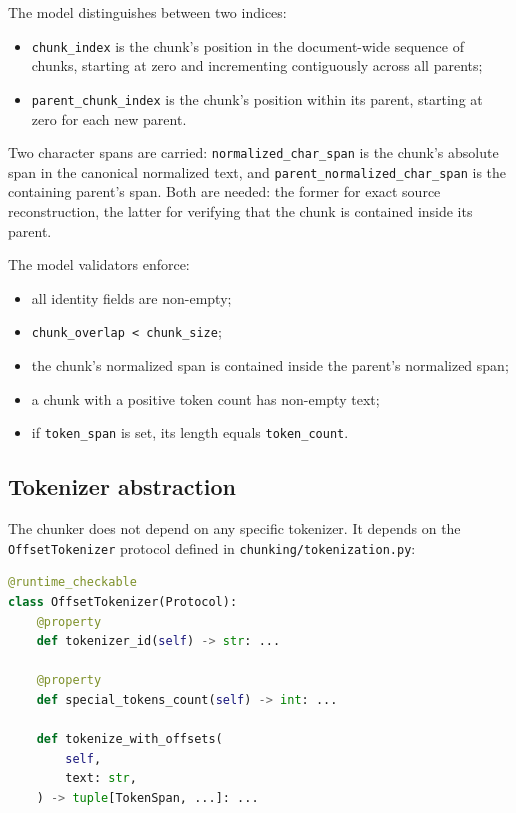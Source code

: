 \documentclass[11pt,a4paper]{article}
\begin{document}
The model distinguishes between two indices:

\begin{itemize}[leftmargin=1.5em,itemsep=0.15em]
  \item \texttt{chunk\_index} is the chunk's position in the
    document-wide sequence of chunks, starting at zero and
    incrementing contiguously across all parents;
  \item \texttt{parent\_chunk\_index} is the chunk's position within
    its parent, starting at zero for each new parent.
\end{itemize}

Two character spans are carried: \texttt{normalized\_char\_span} is
the chunk's absolute span in the canonical normalized text, and
\texttt{parent\_normalized\_char\_span} is the containing parent's
span. Both are needed: the former for exact source reconstruction,
the latter for verifying that the chunk is contained inside its
parent.

The model validators enforce:

\begin{itemize}[leftmargin=1.5em,itemsep=0.15em]
  \item all identity fields are non-empty;
  \item \texttt{chunk\_overlap < chunk\_size};
  \item the chunk's normalized span is contained inside the parent's
    normalized span;
  \item a chunk with a positive token count has non-empty text;
  \item if \texttt{token\_span} is set, its length equals
    \texttt{token\_count}.
\end{itemize}

\subsection{Tokenizer abstraction}
The chunker does not depend on any specific tokenizer. It depends on
the \texttt{OffsetTokenizer} protocol defined in
\texttt{chunking/tokenization.py}:

\begin{lstlisting}[language=python]
@runtime_checkable
class OffsetTokenizer(Protocol):
    @property
    def tokenizer_id(self) -> str: ...

    @property
    def special_tokens_count(self) -> int: ...

    def tokenize_with_offsets(
        self,
        text: str,
    ) -> tuple[TokenSpan, ...]: ...
\end{lstlisting}
\end{document}
